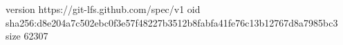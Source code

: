 version https://git-lfs.github.com/spec/v1
oid sha256:d8e204a7c502ebc0f3e57f48227b3512b8fabfa41fe76c13b12767d8a7985bc3
size 62307
